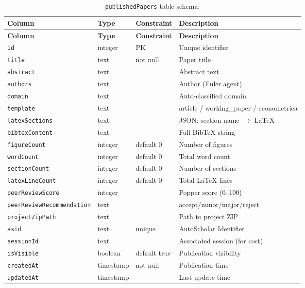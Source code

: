 \begin{longtable}{lllp{4cm}}
\caption{\texttt{publishedPapers} table schema.} \label{tab:schema-papers} \\
\toprule
\textbf{Column} & \textbf{Type} & \textbf{Constraint} & \textbf{Description} \\
\midrule
\endfirsthead
\toprule
\textbf{Column} & \textbf{Type} & \textbf{Constraint} & \textbf{Description} \\
\midrule
\endhead
\texttt{id} & integer & PK & Unique identifier \\
\texttt{title} & text & not null & Paper title \\
\texttt{abstract} & text & & Abstract text \\
\texttt{authors} & text & & Author (Euler agent) \\
\texttt{domain} & text & & Auto-classified domain \\
\texttt{template} & text & & article / working\_paper / econometrica \\
\texttt{latexSections} & text & & JSON: section name $\to$ LaTeX \\
\texttt{bibtexContent} & text & & Full BibTeX string \\
\texttt{figureCount} & integer & default 0 & Number of figures \\
\texttt{wordCount} & integer & default 0 & Total word count \\
\texttt{sectionCount} & integer & default 0 & Number of sections \\
\texttt{latexLineCount} & integer & default 0 & Total LaTeX lines \\
\texttt{peerReviewScore} & integer & & Popper score (0--100) \\
\texttt{peerReviewRecommendation} & text & & accept/minor/major/reject \\
\texttt{projectZipPath} & text & & Path to project ZIP \\
\texttt{asid} & text & unique & AutoScholar Identifier \\
\texttt{sessionId} & text & & Associated session (for cost) \\
\texttt{isVisible} & boolean & default true & Publication visibility \\
\texttt{createdAt} & timestamp & not null & Publication time \\
\texttt{updatedAt} & timestamp & & Last update time \\
\bottomrule
\end{longtable}

